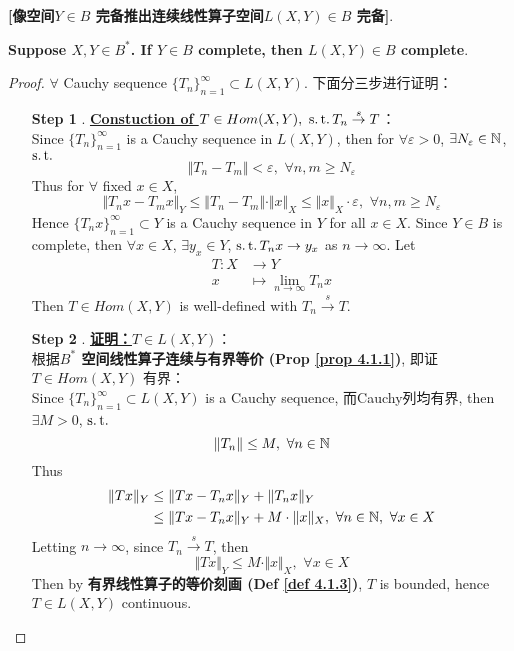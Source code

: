	\begin{thm}\label{thm 4.3.1}
		\textbf{[像空间$Y \in B$ 完备推出连续线性算子空间$L(X , Y) \in B$ 完备]}. 
		\begin{center}
			\textbf{Suppose $X , Y \in B^*$. If $Y \in B$ complete, then $L(X , Y) \in B$ complete}. 
		\end{center}
		
		\vspace*{4em}
		
		\begin{proof}
			$\forall$ Cauchy sequence $\{ T_n \}_{n = 1}^{\infty} \subset L(X , Y)$. 下面分三步进行证明：
			
			\begin{enumerate}
				\item[\textbf{Step 1}]. \underline{\textbf{Constuction of $T \in Hom(X , Y) , \,\, \operatorname{s.t.} T_n \overset{s}{\to} T$}}：\\
				Since $\{ T_n \}_{n = 1}^{\infty}$ is a Cauchy sequence in $L(X , Y)$, then for $\forall \varepsilon > 0$, $\exists N_{\varepsilon} \in \mathbb{N}$, $\operatorname{s.t.}$
				\[ \Vert T_n - T_m \Vert < \varepsilon , \,\, \forall n , m \geq N_{\varepsilon} \]
				Thus for $\forall$ fixed $x \in X$, 
				\[ \Vert T_n x - T_m x \Vert_{Y} \leq \Vert T_n - T_m \Vert \cdot \Vert x \Vert_X \leq \Vert x \Vert_X \cdot \varepsilon , \,\, \forall n , m \geq N_{\varepsilon} \]
				Hence $\{ T_nx \}_{n = 1}^{\infty} \subset Y$ is a Cauchy sequence in $Y$ for all $x \in X$. Since $Y \in B$ is complete, then $\forall x \in X$, $\exists y_x \in Y$, $\operatorname{s.t.} T_n x \to y_x$ as $n \to \infty$. Let 
				\begin{align*}
					T : X &\longrightarrow Y \\
					x &\longmapsto \lim_{n \to \infty} T_n x
				\end{align*}
				Then $T \in Hom(X , Y)$ is well-defined with $T_n \overset{s}{\to} T$. 
				
				\vspace*{8em}
				
				\item[\textbf{Step 2}]. \underline{\textbf{证明：$T \in L(X , Y)$}}：\\
				根据\textbf{$B^*$ 空间线性算子连续与有界等价 (Prop \ref{prop 4.1.1})}, 即证$T \in Hom(X , Y)$ 有界：\\
				Since $\{ T_n \}_{n = 1}^{\infty} \subset L(X , Y)$ is a Cauchy sequence, 而Cauchy列均有界, then $\exists M > 0$, $\operatorname{s.t.}$
				\[ \Vert T_n \Vert \leq M , \,\, \forall n \in \mathbb{N} \]
				Thus 
				\begin{align*}
					\Vert T x \Vert_Y 
					&\leq \Vert Tx - T_n x \Vert_Y + \Vert T_n x \Vert_Y \\
					&\leq \Vert Tx - T_n x \Vert_Y + M \cdot \Vert x \Vert_X , \,\, \forall n \in \mathbb{N} , \,\, \forall x \in X
				\end{align*}
				Letting $n \to \infty$, since $T_n \overset{s}{\to} T$, then 
				\[ \Vert T x \Vert_Y \leq M \cdot \Vert x \Vert_X , \,\, \forall x \in X \]
				Then by \textbf{有界线性算子的等价刻画 (Def \ref{def 4.1.3})}, $T$ is bounded, hence $T \in L(X , Y)$ continuous. 
				

\end{enumerate}
\end{proof}
\end{thm}
